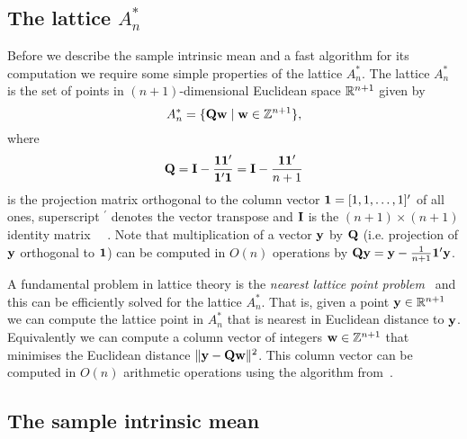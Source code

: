 \documentclass[journal]{../bib/IEEEtran}
\begin{document}
\subsection{The lattice $A_n^*$}

Before we describe the sample intrinsic mean and a fast algorithm for its computation we require some simple properties of the lattice $A_n^*$.   The lattice $A_n^*$ is the set of points in $(n+1)$-dimensional Euclidean space ${\mathbb R}^{n+1}$ given by
\[
A_n^* = \{ \mathbf{Q} \mathbf{w} \mid \mathbf{w} \in {\mathbb Z}^{n+1} \},
\]
where
\begin{equation}\label{eq:Qproj}
\Qbf = \Ibf - \frac{\onebf\onebf^\prime}{\onebf^\prime\onebf} = \Ibf - \frac{\onebf\onebf^\prime}{n+1}
\end{equation}
is the projection matrix orthogonal to the column vector $\boldsymbol{1} = [1,1,\dots,1]^{\prime}$ of all ones,  superscript $^\prime$ denotes the vector transpose and $\mathbf{I}$ is the $(n+1) \times (n+1)$ identity matrix ~\cite{McKilliam2010thesis,McKilliam2009CoxeterLattices,McKilliam2008}~\cite[p. 115]{SPLAG}.  Note that multiplication of a vector $\mathbf{y}$ by $\mathbf{Q}$ (i.e. projection of $\mathbf{y}$ orthogonal to $\boldsymbol{1}$) can be computed in $O(n)$ operations by $\mathbf{Q}\mathbf{y} = \mathbf{y} - \frac{1}{n+1}\boldsymbol{1}^\prime \mathbf{y}$.

A fundamental problem in lattice theory is the \emph{nearest lattice point problem}~\cite{Agrell2002} and this can be efficiently solved for the lattice $A_n^*$.  That is, given a point $\mathbf{y}\in{\mathbb R}^{n+1}$ we can compute the lattice point in $A_n^*$ that is nearest in Euclidean distance to $\mathbf{y}$.  Equivalently we can compute a column vector of integers $\mathbf{w} \in {\mathbb Z}^{n+1}$ that minimises the Euclidean distance $\|\mathbf{y} - \mathbf{Q}\mathbf{w}\|^2$.  This column vector can be computed in $O(n)$ arithmetic operations using the algorithm from~\cite{McKilliam2009CoxeterLattices}\cite[Ch. 3]{McKilliam2010thesis}.

\subsection{The sample intrinsic mean}\label{sec:angul-least-squar}
\end{document}
